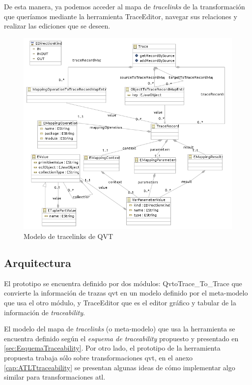 \documentclass[a4paper,12pt,oneside,spanish]{book}
\begin{document}
De esta manera, ya podemos acceder al mapa de \textit{tracelinks} de la transformación que queríamos mediante la herramienta \textsf{TraceEditor}, navegar sus relaciones y realizar las ediciones que se deseen.



\begin{figure}[hbtp]
\centering
\includegraphics[scale=0.78]{./img/QVTTraceModel}
\caption{Modelo de tracelinks de QVT}
\label{fig:QVTTraceModel}
\end{figure}



\subsection{Arquitectura}


El prototipo se encuentra definido por dos módulos: \textsf{QvtoTrace\_To\_Trace} que convierte la información de trazas \gls{qvt} en un modelo definido por el meta-modelo que usa el otro módulo, y \textsf{TraceEditor} que es el editor gráfico y tabular de la información de \textit{traceability}.

El modelo del mapa de \textit{tracelinks} (o meta-modelo) que usa la herramienta se encuentra definido según el \textit{esquema de traceability} propuesto y presentado en \ref{sec:EsquemaTraceability}. Por otro lado, el prototipo de la herramienta propuesta trabaja sólo sobre transformaciones \gls{qvt}, en el anexo \ref{cap:ATLTtraceability} se presentan algunas ideas de cómo implementar algo similar para transformaciones \gls{atl}.
\end{document}
